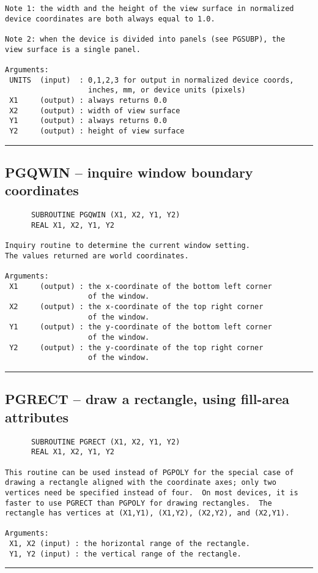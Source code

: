 {\begin{verbatim}
Note 1: the width and the height of the view surface in normalized
device coordinates are both always equal to 1.0.

Note 2: when the device is divided into panels (see PGSUBP), the
view surface is a single panel.

Arguments:
 UNITS  (input)  : 0,1,2,3 for output in normalized device coords, 
                   inches, mm, or device units (pixels)
 X1     (output) : always returns 0.0
 X2     (output) : width of view surface
 Y1     (output) : always returns 0.0
 Y2     (output) : height of view surface
\end{verbatim}
\hrule


\subsection*{PGQWIN -- inquire window boundary coordinates }
\begin{verbatim}
      SUBROUTINE PGQWIN (X1, X2, Y1, Y2)
      REAL X1, X2, Y1, Y2

Inquiry routine to determine the current window setting.
The values returned are world coordinates.

Arguments:
 X1     (output) : the x-coordinate of the bottom left corner
                   of the window.
 X2     (output) : the x-coordinate of the top right corner
                   of the window.
 Y1     (output) : the y-coordinate of the bottom left corner
                   of the window.
 Y2     (output) : the y-coordinate of the top right corner
                   of the window.
\end{verbatim}
\hrule


\subsection*{PGRECT -- draw a rectangle, using fill-area attributes }
\begin{verbatim}
      SUBROUTINE PGRECT (X1, X2, Y1, Y2)
      REAL X1, X2, Y1, Y2

This routine can be used instead of PGPOLY for the special case of
drawing a rectangle aligned with the coordinate axes; only two
vertices need be specified instead of four.  On most devices, it is
faster to use PGRECT than PGPOLY for drawing rectangles.  The
rectangle has vertices at (X1,Y1), (X1,Y2), (X2,Y2), and (X2,Y1).

Arguments:
 X1, X2 (input) : the horizontal range of the rectangle.
 Y1, Y2 (input) : the vertical range of the rectangle.
\end{verbatim}
\hrule


}
